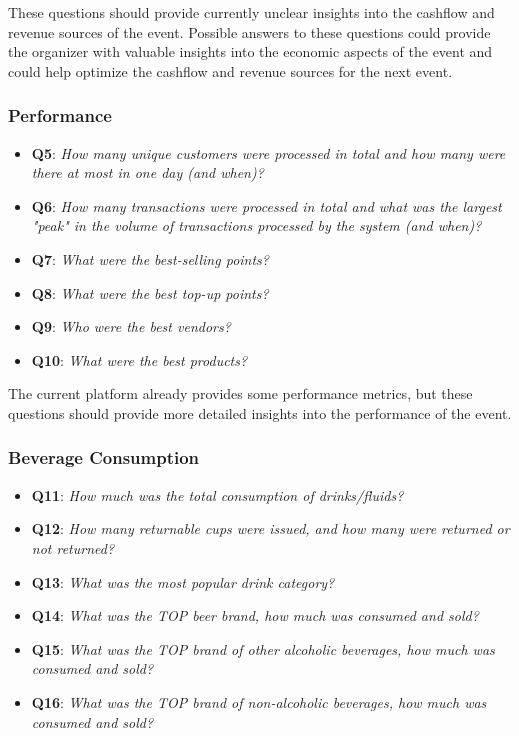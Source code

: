 These questions should provide currently unclear insights into the cashflow and revenue sources of the event.
Possible answers to these questions could provide the organizer with valuable insights into the economic aspects of the event and could help optimize the cashflow and revenue sources for the next event.

\subsubsection*{Performance}
\begin{itemize}
	\item \textbf{Q5}: \textit{How many unique customers were processed in total and how many were there at most in one day (and when)?}
	\item \textbf{Q6}: \textit{How many transactions were processed in total and what was the largest "peak" in the volume of transactions processed by the system (and when)?}
	\item \textbf{Q7}: \textit{What were the best-selling points?}
	\item \textbf{Q8}: \textit{What were the best top-up points?}
	\item \textbf{Q9}: \textit{Who were the best vendors?}
	\item \textbf{Q10}: \textit{What were the best products?}
\end{itemize}

The current platform already provides some performance metrics, but these questions should provide more detailed insights into the performance of the event.

\subsubsection*{Beverage Consumption}
\begin{itemize}
	\item \textbf{Q11}: \textit{How much was the total consumption of drinks/fluids?}
	\item \textbf{Q12}: \textit{How many returnable cups were issued, and how many were returned or not returned?}
	\item \textbf{Q13}: \textit{What was the most popular drink category?}
	\item \textbf{Q14}: \textit{What was the TOP beer brand, how much was consumed and sold?}
	\item \textbf{Q15}: \textit{What was the TOP brand of other alcoholic beverages, how much was consumed and sold?}
	\item \textbf{Q16}: \textit{What was the TOP brand of non-alcoholic beverages, how much was consumed and sold?}
\end{itemize}

